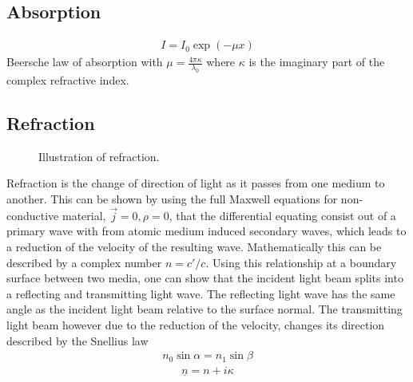 \subsection{Absorption}
%
\begin{align}
    I = I_0 \exp(-\mu x)
\end{align}
%
Beersche law of absorption with $\mu = \frac{4\pi \kappa}{\lambda_0}$ where $\kappa$ is the imaginary part of the complex refractive index.
%
\subsection{Refraction}
%
\begin{figure}[!t]
\centering
\setlength{\tikzwidth}{\textwidth}
\label{fig:optic_refraction}
\caption{Illustration of refraction.}
\end{figure}
%
Refraction is the change of direction of light as it passes from one medium to another.
This can be shown by using the full Maxwell equations  for non-conductive material, \ie{} $\vec{j} = 0, \rho = 0$, that the differential equating consist out of a primary wave with from atomic medium induced secondary waves, which leads to a reduction of the velocity of the resulting wave.
Mathematically this can be described by a complex number $n = c' / c$.
Using this relationship at a boundary surface between two media, one can show that the incident light beam splits into a reflecting and transmitting light wave.
The reflecting light wave has the same angle as the incident light beam relative to the surface normal.
The transmitting light beam however due to the reduction of the velocity, changes its direction described by the Snellius law
\begin{align}
    n_0 \sin \alpha = n_1 \sin \beta \label{eq:Snellius}
\end{align}
%
%
\begin{align}
\underline{n} = n + i\kappa
\end{align}
%
%
%
%
